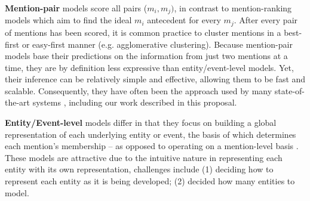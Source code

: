 \textbf{Mention-pair} models score all pairs ($m_i,m_j)$, in contrast to mention-ranking models which aim to find the ideal $m_i$ antecedent for every $m_j$.  After every pair of mentions has been scored, it is common practice to cluster mentions in a best-first or easy-first manner (e.g. agglomerative clustering).  Because mention-pair models base their predictions on the information from just two mentions at a time, they are by definition less expressive than entity/event-level models.  Yet, their inference can be relatively simple and effective, allowing them to be fast and scalable.  Consequently, they have often been the approach used by many state-of-the-art systems \cite{Soon:2001:MLA:972597.972602,DBLP:conf/emnlp/DurrettK13}, including our work described in this proposal.

\textbf{Entity/Event-level} models differ in that they focus on building a global representation of each underlying entity or event, the basis of which determines each mention's membership -- as opposed to operating on a mention-level basis \cite{DBLP:conf/naacl/WisemanRS16,clark2016improving}.  These models are attractive due to the intuitive nature in representing each entity with its own representation, challenges include (1) deciding how to represent each entity as it is being developed; (2) decided how many entities to model.





